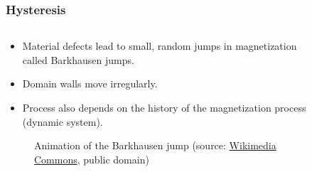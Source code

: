 \begin{frame}
	\frametitle{Hysteresis}
	\begin{columns}
		\begin{column}{0.575\textwidth}
            \begin{itemize}
                \item Material defects lead to small, random jumps in magnetization called Barkhausen jumps.
                \item Domain walls move irregularly.
                \item<2-> Process also depends on the history of the magnetization process (dynamic system).
            \end{itemize}
			\begin{figure}
                \centering
                \caption{Animation of the Barkhausen jump (source: \href{https://commons.wikimedia.org/wiki/File:Barkhausensprung.gif}{Wikimedia Commons},  public domain)}
            \end{figure}
		\end{column}
        \hfill
		\begin{column}{0.425\textwidth}
            \vspace{-0.2cm}
			\onslide<2->\begin{figure}
				\centering

\end{figure}
\end{column}
\end{columns}
\end{frame}
